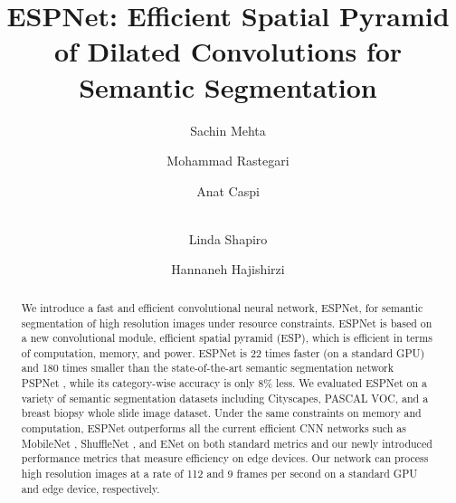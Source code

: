 \documentclass[runningheads]{llncs}
\def\etal{\emph{et al. }}
\begin{document}
\pagestyle{headings}
\mainmatter
\def\ECCV18SubNumber{2342}  

\title{ESPNet: Efficient Spatial Pyramid of Dilated Convolutions for Semantic Segmentation} 


\authorrunning{Mehta \etal}

\author{Sachin Mehta \and Mohammad Rastegari \and Anat Caspi \and \\ Linda Shapiro  \and  Hannaneh Hajishirzi}


\maketitle

\begin{abstract}
We introduce a fast and efficient convolutional neural network, ESPNet, for semantic segmentation of high resolution images under resource constraints. ESPNet is based on a new convolutional module, efficient spatial pyramid (ESP), which is efficient in terms of computation, memory, and power. ESPNet is 22 times faster (on a standard GPU) and 180 times smaller than the state-of-the-art semantic segmentation network PSPNet \cite{zhao2017pyramid}, while its category-wise accuracy is only 8\% less. We evaluated ESPNet on a variety of semantic segmentation datasets including  Cityscapes,  PASCAL VOC, and a breast biopsy whole slide image dataset. Under the same constraints on memory and computation, ESPNet outperforms all the current efficient CNN networks such as MobileNet \cite{howard2017mobilenets}, ShuffleNet \cite{zhang2017shufflenet}, and ENet \cite{paszke2016enet} on both standard metrics and our newly introduced performance metrics that measure efficiency on edge devices. Our network can process high resolution images at a rate of 112 and 9 frames per second on a standard GPU and edge device, respectively.   
\end{abstract}
\end{document}
